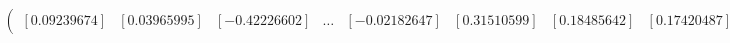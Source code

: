 \documentclass[preview]{standalone}
\begin{document}
\begin{align*}
\begin{pmatrix} [0.09239674] & [0.03965995] & [-0.42226602] & \dots & [-0.02182647] & [0.31510599] & [0.18485642] & [0.17420487] \end{pmatrix}
\end{align*}
\end{document}
